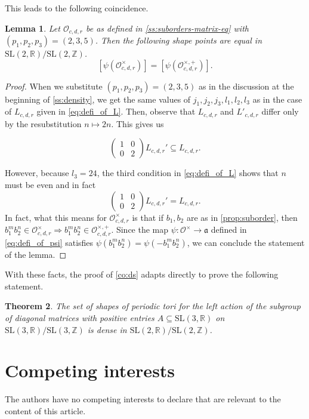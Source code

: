 \documentclass[11pt,letterpaper]{amsart}
\newtheorem{theorem}{Theorem}[section]
\newtheorem{lem}[theorem]{Lemma}
\theoremstyle{definition}
\theoremstyle{remark}
\renewcommand{\rm}[1]{\mathrm{#1}}
\newcommand{\cal}[1]{\mathcal{#1}}
\newcommand{\bb}[1]{\mathbb{#1}}
\renewcommand{\frak}[1]{\mathfrak{#1}}
\newcommand{\R}{\bb R}
\newcommand{\Z}{\bb Z}
\newcommand{\calO}{\cal O}
\newcommand{\SL}{\rm{SL}}
\begin{document}
This leads to the following coincidence.
\begin{lem}
Let $\calO_{c,d,r}$ be as defined in \cref{ss:suborders-matrix-eq} with $(p_1,p_2,p_3)=(2,3,5)$.
Then the following shape points are equal in $\SL(2,\R)/\SL(2,\Z)$.
$$[\psi(\calO_{c,d,r}^{\times})]=[\psi(\calO_{c,d,r}^{\times, +} ) ].$$
\end{lem}
\begin{proof}
When we substitute $(p_1,p_2,p_3)=(2,3,5)$ as in the discussion at the beginning of \cref{ss:density}, we get the same values of $j_1,j_2,j_3,l_1,l_2,l_3$ as in the case of $L_{c,d,r}$ given in \cref{eq:defi_of_L}. Then, observe that $L_{c,d,r}$ and $L'_{c,d,r}$ differ only by the resubstitution $n \mapsto 2n$. This gives us 

$$ \left(
\begin{smallmatrix}
    1 & 0 \\
    0 & 2 
\end{smallmatrix}\right)
L_{c,d,r}' \subseteq L_{c,d,r}.$$

However, because $l_3 = 24$, the third condition in \cref{eq:defi_of_L} shows that $n$ must be even and in fact 
$$ \left(
\begin{smallmatrix}
    1 & 0 \\
    0 & 2 
\end{smallmatrix}\right)
L_{c,d,r}' = L_{c,d,r}.$$
In fact, what this means for $\calO^\times_{c,d,r}$ is that if $b_1,b_2$ are as in \cref{prop:suborder}, then $b_1^mb_2^n \in \calO^{\times}_{c,d,r} \Rightarrow b_1^m b_2^n \in \calO^{\times, +}_{c,d,r}$. Since the map $\psi:\calO^\times \rightarrow \frak a$ defined in \cref{eq:defi_of_psi} satisfies $\psi(b_1^mb_2^n)=\psi(-b_1^mb_2^n)$, we can conclude the statement of the lemma.
\end{proof}


With these facts, the proof of \cref{co:ds} adapts directly to prove the following statement.
\begin{theorem}
    The set of shapes of periodic tori for the left action of the subgroup of diagonal matrices with positive entries $A \subseteq \SL(3,\R)$ on $\SL(3,\R)/\SL(3,\Z)$ is dense in $\SL(2,\R)/\SL(2,\Z)$.
\end{theorem}



\section*{Competing interests} 
The authors have no competing interests to declare that are relevant to the content of this article.
\end{document}
